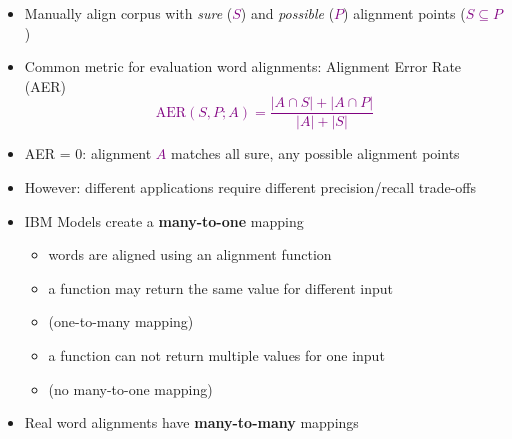 \documentclass[landscape]{slides}
\newcommand{\maths}[1]{\textcolor{purple}{#1}}
\begin{document}
\vspace{10mm}
\begin{itemize}
\item Manually align corpus with {\em sure} (\maths{$S$}) and {\em possible} (\maths{$P$}) alignment points (\maths{$S \subseteq P$})
\item Common metric for evaluation word alignments: Alignment Error Rate (AER)
\maths{\begin{equation*}
\mbox{AER}(S,P;A) =  \frac{|A \cap S| + {|A \cap P|}}{|A|+|S|}
\end{equation*}}
\item AER = 0: alignment \maths{$A$} matches all sure, any possible alignment points
\item However: different applications require different precision/recall trade-offs
\end{itemize}


\vspace{20mm}
\begin{itemize}
\item IBM Models create a {\bf many-to-one} mapping
{\begin{itemize}\itemsep 3mm
\item words are aligned using an alignment function
\item a function may return the same value for different input
\item[]  (one-to-many mapping)
\item a function can not return multiple values for one input
\item[]  (no many-to-one mapping)
\end{itemize} }
\item  Real word alignments have {\bf many-to-many} mappings
\end{itemize}



\end{document}
